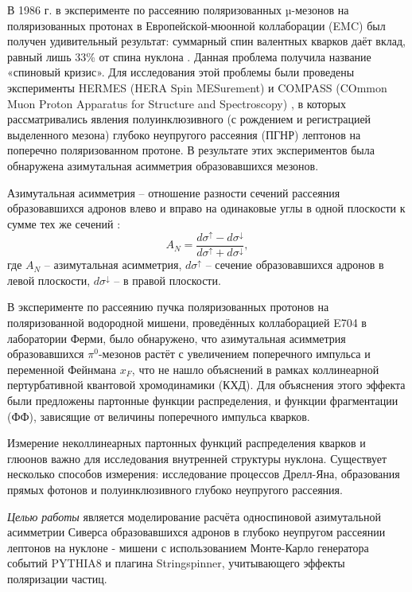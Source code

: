 \documentclass{extreport}
\begin{document}
В 1986 г. в эксперименте по рассеянию поляризованных µ-мезонов на поляризованных протонах в Европейской-мюонной коллаборации (EMC) был получен удивительный результат: суммарный спин валентных кварков даёт вклад, равный лишь 33\% от спина нуклона \cite{Breidenbach}. Данная проблема получила название «спиновый кризис». Для исследования этой проблемы были проведены эксперименты HERMES (HERA Spin MESurement) \cite{hermes_2020} и COMPASS (COmmon Muon Proton Apparatus for Structure and Spectroscopy) \cite{Abbon_2007}, в которых рассматривались явления полуинклюзивного (с рождением и регистрацией выделенного мезона) глубоко неупругого рассеяния (ПГНР) лептонов на поперечно поляризованном протоне. В результате этих экспериментов была обнаружена азимутальная асимметрия образовавшихся мезонов.


Азимутальная асимметрия – отношение разности сечений рассеяния образовавшихся адронов влево и вправо на одинаковые углы в одной плоскости к сумме тех же сечений \cite{Diehl}:
\begin{equation}
    A_N =\frac{d\sigma^\uparrow -d\sigma^\downarrow }{d\sigma^\uparrow +d\sigma^\downarrow },
\end{equation} 
где $A_N$ -- азимутальная асимметрия, $d\sigma^\uparrow$  – сечение образовавшихся адронов в левой плоскости, $d\sigma^\downarrow$  – в правой плоскости.


 В эксперименте по рассеянию пучка поляризованных протонов на поляризованной водородной мишени, проведённых коллаборацией E704 в лаборатории Ферми, было обнаружено, что азимутальная асимметрия образовавшихся $\pi^0$-мезонов растёт с увеличением поперечного импульса и переменной Фейнмана $x_F$, что не нашло объяснений в рамках коллинеарной пертурбативной квантовой хромодинамики (КХД). Для объяснения этого эффекта были предложены партонные функции распределения, и функции фрагментации (ФФ), зависящие от величины поперечного импульса кварков.

 
 Измерение неколлинеарных партонных функций распределения кварков и глюонов важно для исследования внутренней структуры нуклона. Существует несколько способов измерения: исследование процессов Дрелл-Яна, образования прямых фотонов и полуинклюзивного глубоко неупругого рассеяния. 

\textit{Целью работы} является моделирование расчёта односпиновой азимутальной асимметрии Сиверса образовавшихся адронов в глубоко неупругом рассеянии лептонов на нуклоне - мишени с использованием Монте-Карло генератора событий PYTHIA8 и плагина Stringspinner, учитывающего эффекты поляризации частиц. 
\end{document}
